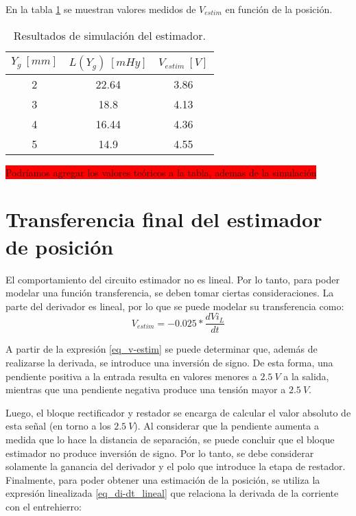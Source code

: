 En la tabla \ref{tab_Resultados_de_simulación_del_estimador} se muestran valores medidos de $V_{estim}$ en función de la posición.


\begin{table}[H]
	\begin{center}
		\begin{tabular}{| c | c | c |}
			\hline
			$Y_g\:[mm]$ & $L(Y_g)\:[mHy]$ & $V_{estim}\:[V]$ \\ \hline 
			2 & 22.64 & 3.86 \\ \hline 
			3 & 18.8 & 4.13 \\ \hline 
			4 & 16.44 & 4.36 \\ \hline 
			5 & 14.9 & 4.55 \\ \hline 
		\end{tabular}
		\caption{Resultados de simulación del estimador.}
		\label{tab_Resultados_de_simulación_del_estimador}
	\end{center}
\end{table}

\colorbox{red}{Podríamos agregar los valores teóricos a la tabla, ademas de la simulación}

\section{Transferencia final del estimador de posición}

El comportamiento del circuito estimador no es lineal.  Por lo tanto, para poder modelar una función transferencia, se deben tomar ciertas consideraciones. La parte del derivador es lineal, por lo que se puede modelar su transferencia como:
\begin{equation}\label{eq_v-estim}
	V_{estim}=-0.025*\frac{dVi_L}{dt} 
\end{equation}

A partir de la expresión \ref{eq_v-estim} se puede determinar que, además de realizarse la derivada, se introduce una inversión de signo. De esta forma, una pendiente positiva a la entrada resulta en valores menores a $2.5\:V$ a la salida, mientras que una pendiente negativa produce una tensión mayor a $2.5\:V$.

Luego, el bloque rectificador y restador se encarga de calcular el valor absoluto de esta señal (en torno a los $2.5\:V$). Al considerar que la pendiente aumenta a medida que lo hace la distancia de separación, se puede concluir que el bloque estimador no produce inversión de signo. Por lo tanto, se debe considerar solamente la ganancia del derivador y el polo que introduce la etapa de restador. Finalmente, para poder obtener una estimación de la posición, se utiliza la expresión linealizada \ref{eq_di-dt_lineal} que relaciona la derivada de la corriente con el entrehierro:

